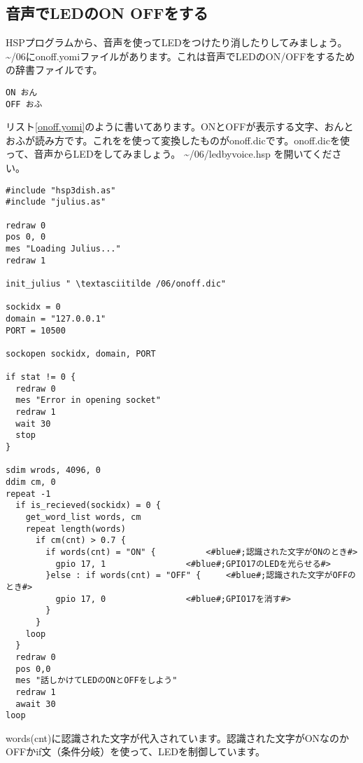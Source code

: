 \subsection{音声でLEDのON OFFをする}
HSPプログラムから、音声を使ってLEDをつけたり消したりしてみましょう。 \textasciitilde /06にonoff.yomiファイルがあります。これは音声でLEDのON/OFFをするための辞書ファイルです。\\

\begin{lstlisting}[caption=onoff.yomi,label=onoff.yomi]
ON おん
OFF おふ
\end{lstlisting}

リスト\ref{onoff.yomi}のように書いてあります。ONとOFFが表示する文字、おんとおふが読み方です。これをを使って変換したものがonoff.dicです。onoff.dicを使って、音声からLEDをしてみましょう。 \textasciitilde /06/ledbyvoice.hsp を開いてください。\\

\begin{lstlisting}[caption=ledvoice.hsp,label=ledvoice.hsp]
#include "hsp3dish.as"
#include "julius.as"

redraw 0
pos 0, 0
mes "Loading Julius..."
redraw 1

init_julius " \textasciitilde /06/onoff.dic"

sockidx = 0
domain = "127.0.0.1"
PORT = 10500

sockopen sockidx, domain, PORT

if stat != 0 {
  redraw 0
  mes "Error in opening socket"
  redraw 1
  wait 30
  stop
}

sdim wrods, 4096, 0
ddim cm, 0
repeat -1
  if is_recieved(sockidx) = 0 {
    get_word_list words, cm
    repeat length(words)
      if cm(cnt) > 0.7 {
        if words(cnt) = "ON" {			<#blue#;認識された文字がONのとき#>
          gpio 17, 1				<#blue#;GPIO17のLEDを光らせる#>
        }else : if words(cnt) = "OFF" {		<#blue#;認識された文字がOFFのとき#>
          gpio 17, 0				<#blue#;GPIO17を消す#>
        }
      }
    loop
  }
  redraw 0
  pos 0,0
  mes "話しかけてLEDのONとOFFをしよう"
  redraw 1
  await 30
loop
\end{lstlisting}

words(cnt)に認識された文字が代入されています。認識された文字がONなのかOFFかif文（条件分岐）を使って、LEDを制御しています。\\

\begin{tcolorbox}[title=\useOmetoi]
\begin{enumerate}
\end{enumerate}
\end{tcolorbox}
